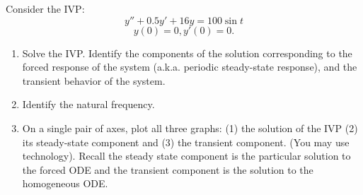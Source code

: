 

\begin{problem}[1]
Consider the IVP:
\[y'' + 0.5y' + 16y = 100 \sin t\]
\[y(0) = 0,y'(0) = 0.\]
\begin{enumerate}
\item Solve the IVP. Identify the components of the solution corresponding to the forced response of the system (a.k.a. periodic steady-state response), and the transient behavior of the system.
\item Identify the natural frequency.
\item On a single pair of axes, plot all three graphs: (1) the solution of the IVP (2) its steady-state component and (3) the transient component. (You may use technology). Recall the steady state component is the particular solution to the forced ODE and the transient component is the solution to the homogeneous ODE.
\end{enumerate}
\end{problem}

\newpage


